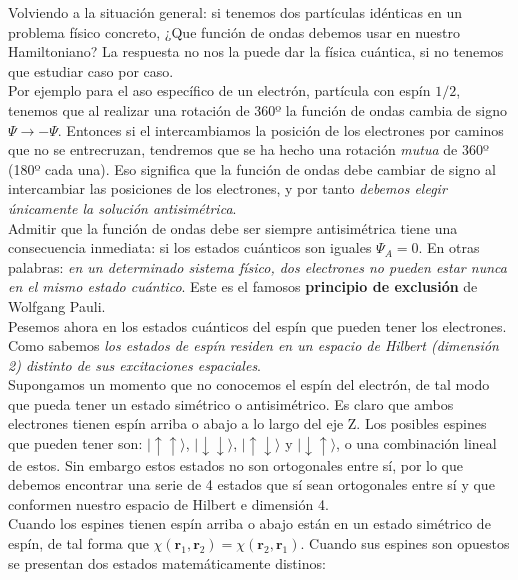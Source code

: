 \documentclass[12pt,a4paper]{article}
\numberwithin{equation}{section}
\numberwithin{figure}{section}
\newcommand{\rn}{\mathbf{r}}
\begin{document}
Volviendo a la situación general: si tenemos dos partículas idénticas en un problema físico concreto, ¿Que función de ondas debemos usar en nuestro Hamiltoniano? La respuesta no nos la puede dar la física cuántica, si no tenemos que estudiar caso por caso. \\

Por ejemplo para el aso específico de un electrón, partícula con espín $1/2$, tenemos que al realizar una rotación de 360º la función de ondas cambia de signo $\Psi \rightarrow - \Psi$. Entonces si el intercambiamos la posición de los electrones por caminos que no se entrecruzan, tendremos que se ha hecho una rotación \textit{mutua} de 360º (180º cada una).  Eso significa que la función de ondas debe cambiar de signo al intercambiar las posiciones de los electrones, y por tanto \textit{debemos elegir únicamente la solución antisimétrica}. \\

Admitir que la función de ondas debe ser siempre antisimétrica tiene una consecuencia inmediata: si los estados cuánticos son iguales $\Psi_A = 0$. En otras palabras: \textit{en un determinado sistema físico, dos electrones no pueden estar nunca en el mismo estado cuántico}. Este es el famosos \textbf{principio de exclusión} de Wolfgang Pauli. \\

Pesemos ahora en los estados cuánticos del espín que pueden tener los electrones. Como sabemos \textit{los estados de espín residen en un espacio de Hilbert (dimensión 2) distinto de sus excitaciones espaciales}. \\

Supongamos un momento que no conocemos el espín del electrón, de tal modo que pueda tener un estado simétrico o antisimétrico. Es claro que ambos electrones tienen espín arriba o abajo a lo largo del eje Z. Los posibles espines que pueden tener son:  $ \vert \uparrow \uparrow \rangle $, $\vert \downarrow \downarrow \rangle$, $\vert \uparrow \downarrow \rangle$ y $\vert \downarrow \uparrow \rangle$, o una combinación lineal de estos. Sin embargo estos estados no son ortogonales entre sí, por lo que debemos encontrar una serie de 4 estados que sí sean ortogonales entre sí y que conformen nuestro espacio de Hilbert e dimensión 4. \\

 Cuando los espines tienen espín arriba o abajo están en un estado simétrico de espín, de tal forma que $\chi (\rn_1,\rn_2) = \chi (\rn_2,\rn_1)$. Cuando sus espines son opuestos se presentan dos estados matemáticamente distinos:
\end{document}
